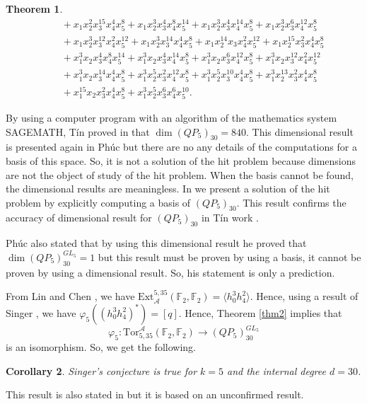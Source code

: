 \documentclass[reqno]{amsart}
\theoremstyle{plain}
\newtheorem{thm}{Theorem}[section]
\newtheorem{corl}[thm]{Corollary}
\theoremstyle{definition}
\theoremstyle{plain}
\theoremstyle{definition}
\numberwithin{equation}{section}
\begin{document}
\begin{thm}
\begin{align*}
&\quad + x_1x_2^{2}x_3^{15}x_4^{4}x_5^{8} + x_1x_2^{3}x_3^{4}x_4^{8}x_5^{14} + x_1x_2^{3}x_3^{4}x_4^{14}x_5^{8} + x_1x_2^{3}x_3^{6}x_4^{12}x_5^{8}\\ 
&\quad + x_1x_2^{3}x_3^{12}x_4^{2}x_5^{12} + x_1x_2^{3}x_3^{14}x_4^{4}x_5^{8} + x_1x_2^{14}x_3x_4^{2}x_5^{12} + x_1x_2^{15}x_3^{2}x_4^{4}x_5^{8}\\ 
&\quad + x_1^{3}x_2x_3^{4}x_4^{8}x_5^{14} + x_1^{3}x_2x_3^{4}x_4^{14}x_5^{8} + x_1^{3}x_2x_3^{6}x_4^{12}x_5^{8} + x_1^{3}x_2x_3^{12}x_4^{2}x_5^{12}\\ 
&\quad + x_1^{3}x_2x_3^{14}x_4^{4}x_5^{8} + x_1^{3}x_2^{5}x_3^{2}x_4^{12}x_5^{8} + x_1^{3}x_2^{5}x_3^{10}x_4^{4}x_5^{8} + x_1^{3}x_2^{13}x_3^{2}x_4^{4}x_5^{8}\\ 
&\quad + x_1^{15}x_2x_3^{2}x_4^{4}x_5^{8} + x_1^{3}x_2^{5}x_3^{6}x_4^{6}x_5^{10}.
\end{align*}
\end{thm}
By using a computer program with an algorithm of the mathematics system SAGEMATH, T\'in proved in \cite[Page 1923]{Tur} that $\dim(QP_5)_{30} = 840$. This dimensional result is presented again in Ph\'uc \cite[Appendix]{pp21} but there are no any details of the computations for a basis of this space. So, it is not a solution of the hit problem because dimensions are not the object of study of the hit problem. When the basis cannot be found, the dimensional results are meaningless. In \cite{smo} we present a solution of the hit problem by explicitly computing a basis of $(QP_5)_{30}$. This result confirms the accuracy of dimensional result for $(QP_5)_{30}$ in T\'in work \cite{Tur}. 

Ph\'uc \cite{pp21} also stated that by using this dimensional result he proved that $\dim(QP_5)_{30}^{GL_5}=1$ but this result must be proven by using a basis, it cannot be proven by using a dimensional result. So, his statement is only a prediction. 

From Lin \cite{wl} and Chen \cite{che}, we have $\mbox{Ext}_{\mathcal A}^{5,35}(\mathbb F_2, \mathbb F_2) = \langle h_0^3h_4^2  \rangle$. Hence, using a result of Singer \cite{si1}, we have $\varphi_5((h_0^3h_4^2)^*) = [q]$. Hence, Theorem \ref{thm2} implies that 
$$\varphi_5: \mbox{Tor}_{5,35}^{\mathcal A}(\mathbb F_2,\mathbb F_2) \longrightarrow (QP_5)_{30}^{GL_5}$$
is an isomorphism. So, we get the following.

\begin{corl} Singer's conjecture is true for $k=5$ and the internal degree $d=30$.
\end{corl}
This result is also stated in \cite{pp21} but it is based on an unconfirmed result. 
  
\end{document}
